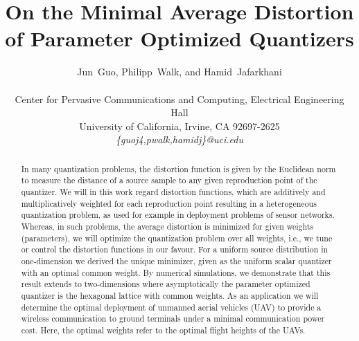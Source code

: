 \documentclass[smallabstract,smallcaptions]{dccpaper}
\newif\ifarxiv\arxivfalse
\newcounter{example}[section]
\begin{document}
%
\ifarxiv
\else
\renewcommand{\baselinestretch}{.95}
\setlength{\belowcaptionskip}{-2ex}
\fi
\title{On the Minimal Average Distortion of Parameter Optimized Quantizers}



\author{Jun~Guo, Philipp~Walk, and Hamid~Jafarkhani\\
  {\small\hspace{-0.5cm}\begin{minipage}{\textwidth}
\begin{tabular}{c}
Center for Pervasive Communications and Computing, Electrical Engineering Hall  \\
University of California, Irvine, CA 92697-2625 \\
{\it\{guoj4,pwalk,hamidj\}@uci.edu}
\end{tabular}
\end{minipage}\vspace{0.2cm}}
}

\maketitle
\begin{abstract}
  In many quantization problems, the distortion function is given by the Euclidean norm to measure the distance of a
  source sample to any given reproduction point of the quantizer. We will in this work regard distortion functions,
  which are additively and multiplicatively weighted for each reproduction point resulting in a heterogeneous
  quantization problem, as used for example in deployment problems of sensor networks. Whereas, in such problems, the
  average distortion is minimized for given weights (parameters), we will optimize the quantization problem over all
  weights, i.e., we tune or control the distortion functions in our favour. 
  For a uniform source distribution in one-dimension we derived the unique minimizer, given as the uniform scalar
  quantizer with an optimal common weight. By numerical simulations, we demonstrate that this result extends to
  two-dimensions where asymptotically the parameter optimized quantizer is the hexagonal lattice with common weights. As
  an application we will determine the optimal deployment of unmanned aerial vehicles (UAV) to provide a wireless
  communication to ground terminals under a minimal communication power cost. Here, the optimal weights refer to the
  optimal flight heights of the UAVs.
\end{abstract}
%
\end{document}
